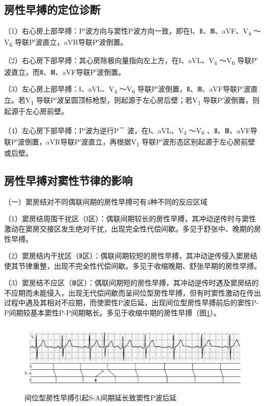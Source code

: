 \protect\hypertarget{text00018.htmlux5cux23subid136}{}{}

\subsection{房性早搏的定位诊断}

（1）右心房上部早搏：P′波方向与窦性P波方向一致，即在Ⅰ、Ⅱ、Ⅲ、aVF、V\textsubscript{4}
～V\textsubscript{6} 导联P′波直立，aVR导联P′波倒置。

（2）右心房下部早搏：其心房除极向量指向左上方，在Ⅰ、aVL、V\textsubscript{4}
～V\textsubscript{6} 导联P′波直立，而Ⅱ、Ⅲ、aVF导联P′波倒置。

（3）左心房上部早搏：Ⅰ、aVL、V\textsubscript{4} ～V\textsubscript{6}
导联P′波倒置，Ⅱ、Ⅲ、aVF导联P′波直立。若V\textsubscript{1}
导联P′波呈圆顶标枪型，则起源于左心房后壁；若V\textsubscript{1}
导联P′波倒置，则起源于左心房前壁。

（4）左心房下部早搏：P′波为逆行P\textsuperscript{－}
波，在Ⅰ、aVL、V\textsubscript{4} ～V\textsubscript{6}
、Ⅱ、Ⅲ、aVF导联P′波倒置，aVR导联P′波直立，再根据V\textsubscript{1}
导联P′波形态区别起源于左心房前壁或后壁。

\protect\hypertarget{text00018.htmlux5cux23subid137}{}{}

\subsection{房性早搏对窦性节律的影响}

（一）窦房结对不同偶联间期的房性早搏可有4种不同的反应区域

（1）窦房结周围干扰区（Ⅰ区）：偶联间期较长的房性早搏，其冲动逆传时与窦性激动在窦房交接区发生绝对干扰，出现完全性代偿间歇。多见于舒张中、晚期的房性早搏。

（2）窦房结内干扰区（Ⅱ区）：偶联间期较短的房性早搏，其冲动逆传侵入窦房结使其节律重整，出现不完全性代偿间歇。多见于收缩晚期、舒张早期的房性早搏。

（3）窦房结不应区（Ⅲ区）：偶联间期短的房性早搏，其冲动逆传时遇及窦房结的不应期而未能侵入，出现无代偿间歇而呈间位型房性早搏，但有时窦性激动在传出过程中遇及其相对不应期，而使窦性P波后延，出现间位型房性早搏前后的窦性P-P间期较基本窦性P-P间期略长。多见于收缩中期的房性早搏（图\ref{fig11-6}）。

\begin{figure}[!htbp]
 \centering
 \includegraphics[width=5.73958in,height=1.34375in]{./images/Image00158.jpg}
 \captionsetup{justification=centering}
 \caption{间位型房性早搏引起S-A间期延长致窦性P波后延}
 \label{fig11-6}
  \end{figure} 

